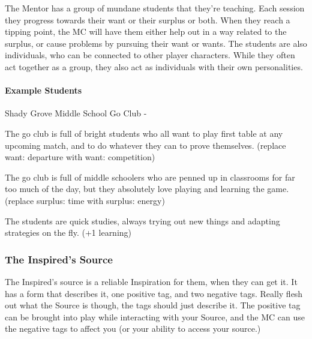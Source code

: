 \documentclass[
  oneside,
  statementpaper,
  9pt]{memoir}
\begin{document}
\begin{Player}

The Mentor has a group of mundane students that they’re teaching. Each session they progress towards their want or their surplus or both. When they reach a tipping point, the MC will have them either help out in a way related to the surplus, or cause problems by pursuing their want or wants. The students are also individuals, who can be connected to other player characters. While they often act together as a group, they also act as individuals with their own personalities. 

\end{Player}

\hypertarget{example-students}{%
\paragraph{Example Students}\label{example-students}}

\begin{Player}

Shady Grove Middle School Go Club - 

The go club is full of bright students who all want to play first table at any upcoming match, and to do whatever they can to prove themselves. (replace want: departure with want: competition)

The go club is full of middle schoolers who are penned up in classrooms for far too much of the day, but they absolutely love playing and learning the game. (replace surplus: time with surplus: energy)

The students are quick studies, always trying out new things and adapting strategies on the fly. (+1 learning)

\end{Player}

\hypertarget{the-inspireds-source}{%
\subsubsection{The Inspired's Source}\label{the-inspireds-source}}

\begin{Player}

The Inspired’s source is a reliable Inspiration for them, when they can get it. It has a form that describes it, one positive tag, and two negative tags. Really flesh out what the Source is though, the tags should just describe it. The positive tag can be brought into play while interacting with your Source, and the MC can use the negative tags to affect you (or your ability to access your source.)

\end{Player}
\end{document}
